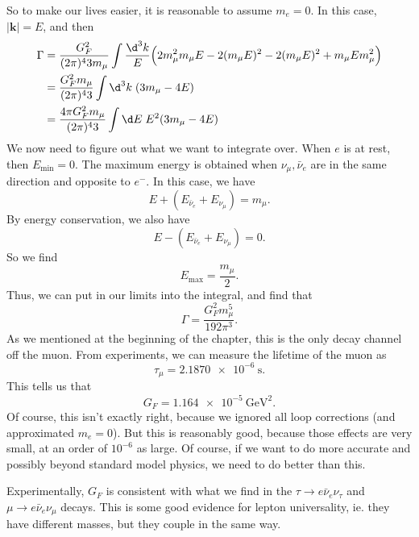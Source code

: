 \documentclass[a4paper]{article}
\begin{document}
So to make our lives easier, it is reasonable to assume $m_e = 0$. In this case, $|\mathbf{k}| = E$, and then
\begin{align*}
  \Gamma &= \frac{G_F^2}{(2\pi)^4 3m_\mu} \int \frac{\d^3 k}{E} \Big(2 m_\mu^2 m_\mu E - 2 (m_\mu E)^2 - 2 (m_\mu E)^2 + m_\mu E m_\mu^2\Big)\\
  &= \frac{G_F^2 m_\mu}{ (2\pi)^4 3} \int \d^3 k\; (3 m_\mu - 4 E)\\
  &= \frac{4\pi G_F^2 m_\mu}{(2\pi)^4 3} \int \d E\; E^2(3 m_\mu - 4E)
\end{align*}
We now need to figure out what we want to integrate over. When $e$ is at rest, then $E_{\mathrm{min}} = 0$. The maximum energy is obtained when $\nu_\mu, \bar{\nu}_e$ are in the same direction and opposite to $e^-$. In this case, we have
\[
  E + (E_{\bar{\nu}_e} + E_{\nu_\mu}) = m_\mu.
\]
By energy conservation, we also have
\[
  E - (E_{\bar{\nu}_e} + E_{\nu_\mu}) = 0.
\]
So we find
\[
  E_{\mathrm{max}} = \frac{m_\mu}{2}.
\]
Thus, we can put in our limits into the integral, and find that %
\[
  \Gamma = \frac{G_F^2 m_\mu^5}{192 \pi^3}.
\]
As we mentioned at the beginning of the chapter, this is the only decay channel off the muon. From experiments, we can measure the lifetime of the muon as
\[
  \tau_{\mu} = \SI{2.1870e-6}{\second}.
\]
This tells us that
\[
  G_F = \SI{1.164e-5}{\giga\electronvolt\squared}.
\]
Of course, this isn't exactly right, because we ignored all loop corrections (and approximated $m_e = 0$). But this is reasonably good, because those effects are very small, at an order of $10^{-6}$ as large. Of course, if we want to do more accurate and possibly beyond standard model physics, we need to do better than this.

Experimentally, $G_F$ is consistent with what we find in the $\tau \to e \bar{\nu}_e \nu_\tau$ and $\mu \to e \bar{\nu}_e \nu_\mu$ decays. This is some good evidence for lepton universality, ie. they have different masses, but they couple in the same way.
\end{document}
